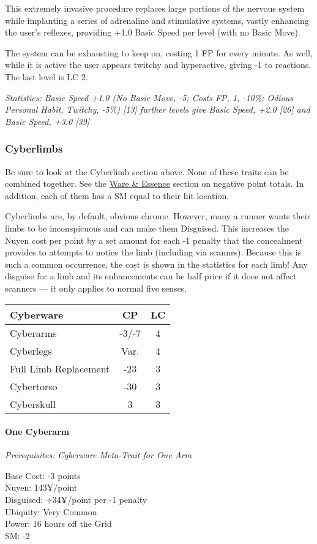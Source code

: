 \begin{multicols*}{3}
	This extremely invasive procedure replaces large portions of the nervous system while implanting a series of adrenaline and stimulative systems, vastly enhancing the user's reflexes, providing +1.0 Basic Speed per level (with no Basic Move).
	
	The system can be exhausting to keep on, costing 1 FP for every minute. As well, while it is active the user appears twitchy and hyperactive, giving -1 to reactions. The last level is LC 2.
	
	\textit{\textcolor{OliveGreen}{Statistics: Basic Speed +1.0 (No Basic Move, -5; Costs FP, 1, -10\%; Odious Personal Habit, Twitchy, -5\%) [13] further levels give Basic Speed, +2.0 [26] and Basic Speed, +3.0 [39]}}
	
	\subsubsection{Cyberlimbs}
	
	Be sure to look at the Cyberlimb section above. None of these traits can be combined together. See the \hyperref[ware]{Ware \& Essence} section on negative point totals. In addition, each of them has a SM equal to their hit location.
	
	Cyberlimbs are, by default, obvious chrome. However, many a runner wants their limbs to be inconspicuous and can make them Disguised. This increases the Nuyen cost per point by a set amount for each -1 penalty that the concealment provides to attempts to notice the limb (including via scannrs). Because this is such a common occurrence, the cost is shown in the statistics for each limb! Any disguise for a limb and its enhancements can be half price if it does not affect scanners — it only applies to normal five senses.
	
	\begin{center}
		\begin{tabularx}{0.32\textwidth}{|X|c|c|}
			\hline
			Cyberware & CP & LC\\
			\hline
			\hline
			Cyberarms & -3/-7 & 4 \\
			Cyberlegs & Var. & 4 \\
			Full Limb Replacement & -23 & 3 \\
			Cybertorso & -30 & 3 \\
			Cyberskull & 3 & 3 \\
			\hline
		\end{tabularx}
	\end{center}
	
	\paragraph{One Cyberarm}
	\textit{Prerequisites:  Cyberware Meta-Trait for One Arm}
	\begin{flushright}
		Base Cost: -3 points\\
		Nuyen: 143¥/point\\
		Disguised: +34¥/point per -1 penalty\\
		Ubiquity: Very Common\\
		Power: 16 hours off the Grid\\
		SM: -2
	\end{flushright}
	

\end{multicols*}

